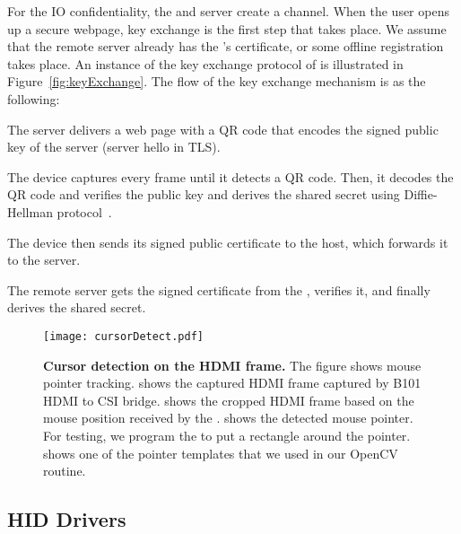 For the IO confidentiality, the \device and server create a \tls channel. When the user opens up a secure webpage, key exchange is the first step that takes place. We assume that the remote server already has the \device's certificate, or some offline registration takes place. An instance of the key exchange protocol of \name is illustrated in Figure~\ref{fig:keyExchange}. The flow of the key exchange mechanism is as the following:
\begin{mylist}
  \item[\one] The server delivers a web page with a QR code that encodes the signed public key of the server (server hello in TLS). 
  \item[\two] The device captures every frame until it detects a QR code. Then, it decodes the QR code and verifies the public key and derives the shared secret using Diffie-Hellman protocol~\cite{blake1998authenticated}. 
  \item[\three] The device then sends its signed public certificate to the host, which forwards it to the server.
  \item[\four] The remote server gets the signed certificate from the \device, verifies it, and finally derives the shared secret.
\end{mylist}

\begin{figure}[t]
\centering
\texttt{[image: cursorDetect.pdf]}
\caption{\textbf{Cursor detection on the HDMI frame.} The figure shows \name mouse pointer tracking. \one shows the captured HDMI frame captured by B101 HDMI to CSI bridge. \two shows the cropped HDMI frame based on the mouse position received by the \device. \three shows the detected mouse pointer. For testing, we program the \device to put a rectangle around the pointer. \four shows one of the pointer templates that we used in our OpenCV routine.}
\spacesave
\label{fig:cursorDetect}
\centering
\end{figure} 

\subsection{HID Drivers}


